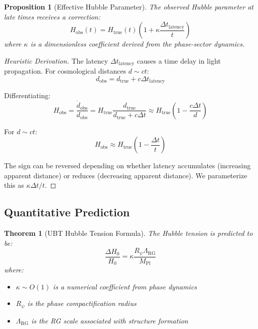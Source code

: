 \documentclass[12pt]{article}
\newtheorem{theorem}[definition]{Theorem}
\newtheorem{proposition}[definition]{Proposition}
\newcommand{\RG}{\text{RG}}
\begin{document}
\begin{proposition}[Effective Hubble Parameter]
The observed Hubble parameter at late times receives a correction:
\begin{equation}
H_{\text{obs}}(t) = H_{\text{true}}(t) \left(1 + \kappa \frac{\Delta t_{\text{latency}}}{t}\right)
\label{eq:hubble_latency}
\end{equation}
where $\kappa$ is a dimensionless coefficient derived from the phase-sector dynamics.
\end{proposition}

\begin{proof}[Heuristic Derivation]
The latency $\Delta t_{\text{latency}}$ causes a time delay in light propagation. For cosmological distances $d \sim c t$:
\begin{equation}
d_{\text{obs}} = d_{\text{true}} + c \Delta t_{\text{latency}}
\end{equation}

Differentiating:
\begin{equation}
H_{\text{obs}} = \frac{\dot{d}_{\text{obs}}}{d_{\text{obs}}} = H_{\text{true}} \frac{d_{\text{true}}}{d_{\text{true}} + c \Delta t} \approx H_{\text{true}} \left(1 - \frac{c \Delta t}{d}\right)
\end{equation}

For $d \sim c t$:
\begin{equation}
H_{\text{obs}} \approx H_{\text{true}} \left(1 - \frac{\Delta t}{t}\right)
\end{equation}

The sign can be reversed depending on whether latency accumulates (increasing apparent distance) or reduces (decreasing apparent distance). We parameterize this as $\kappa \Delta t / t$.
\end{proof}

\subsection{Quantitative Prediction}

\begin{theorem}[UBT Hubble Tension Formula]
The Hubble tension is predicted to be:
\begin{equation}
\frac{\Delta H_0}{H_0} = \kappa \frac{R_\psi \Lambda_{\RG}}{M_{\text{Pl}}}
\label{eq:tension_prediction}
\end{equation}
where:
\begin{itemize}
    \item $\kappa \sim O(1)$ is a numerical coefficient from phase dynamics
    \item $R_\psi$ is the phase compactification radius
    \item $\Lambda_{\RG}$ is the RG scale associated with structure formation
\end{itemize}
\end{theorem}
\end{document}
